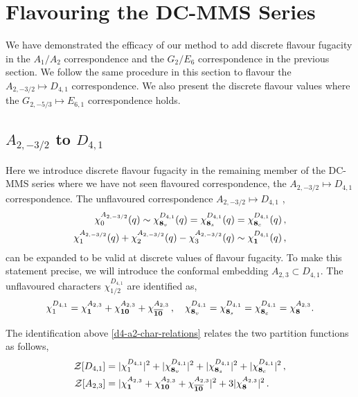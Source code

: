 \documentclass[a4paper,12pt]{article}
\begin{document}
\section{Flavouring the DC-MMS Series}\label{flavouredDC}

 We have demonstrated the efficacy of our method to add discrete flavour fugacity in the $A_1/A_2$ correspondence and the $G_2/E_6$ correspondence in the previous section. We follow the same procedure in this section to flavour the $A_{2,-3/2}\mapsto D_{4,1}$ correspondence. We also present the discrete flavour values where the $G_{2,-5/3}\mapsto E_{6,1}$ correspondence holds.

\subsection{\ensuremath{A_{2,-3/2}} to \ensuremath{D_{4,1}}}
Here we introduce discrete flavour fugacity in the remaining member of the DC-MMS series where we have not seen flavoured correspondence, the $A_{2,-3/2}\mapsto D_{4,1}$ correspondence. The unflavoured correspondence $A_{2,-3/2}\mapsto D_{4,1}$ \cite{Buican:2017rya},
\begin{align}
    \chi_{0}^{A_{2,-3/2}}(q)\sim \chi_{\mathbf{8}_v}^{D_{4,1}}(q)=\chi_{\mathbf{8}_s}^{D_{4,1}}(q)=\chi_{\mathbf{8}_c}^{D_{4,1}}(q)\, ,\nonumber\\
    \chi_{1}^{A_{2,-3/2}}(q)+\chi_{2}^{A_{2,-3/2}}(q)-\chi_{3}^{A_{2,-3/2}}(q)\sim \chi_{\bf 1}^{D_{4,1}}(q)\, ,
\end{align} 
can be expanded to be valid at discrete values of flavour fugacity. To make this statement precise, we will introduce the conformal embedding $A_{2,3}\subset D_{4,1}$. The unflavoured characters $\chi_{1/2}^{D_{4,1}}$ are identified as,
\begin{equation}\label{d4-a2-char-relations}
    \chi_{1}^{D_{4,1}}=\chi_{\bf 1}^{A_{2,3}}+\chi_{\bf 10}^{A_{2,3}}+\chi_{\overline{\mathbf{10}}}^{A_{2,3}}\, ,\quad  \chi_{\mathbf{8}_v}^{D_{4,1}}=\chi_{\mathbf{8}_s}^{D_{4,1}}=\chi_{\mathbf{8}_c}^{D_{4,1}}=\chi_{\bf 8}^{A_{2,3}}.
\end{equation}

The identification above \eqref{d4-a2-char-relations} relates the two partition functions as follows,
\begin{align}
    \mathcal{Z}[D_{4,1}]&=|\chi_{1}^{D_{4,1}}|^2+|\chi_{\mathbf{8}_v}^{D_{4,1}}|^2+|\chi_{\mathbf{8}_s}^{D_{4,1}}|^2+|\chi_{\mathbf{8}_c}^{D_{4,1}}|^2\, ,\nonumber\\
    \mathcal{Z}[A_{2,3}]&=|\chi_{\bf 1}^{A_{2,3}}+\chi_{\bf 10}^{A_{2,3}}+\chi_{\overline{\mathbf{10}}}^{A_{2,3}}|^2+3|\chi_{\bf 8}^{A_{2,3}}|^2\, .
\end{align}
\end{document}
